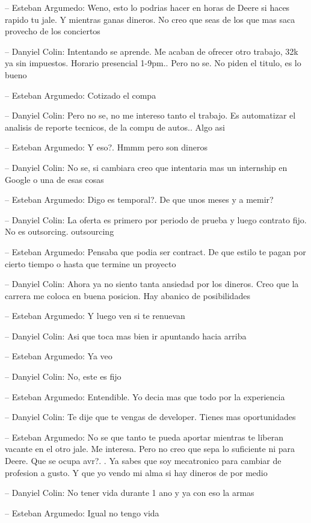 -- Esteban Argumedo: Weno, esto lo podrias hacer en horas de Deere si
haces rapido tu jale. Y mientras ganas dineros. No creo que seas de los
que mas saca provecho de los conciertos

-- Danyiel Colin: Intentando se aprende. Me acaban de ofrecer otro
trabajo, 32k ya sin impuestos. Horario presencial 1-9pm.. Pero no se. No
piden el titulo, es lo bueno

-- Esteban Argumedo: Cotizado el compa

-- Danyiel Colin: Pero no se, no me intereso tanto el trabajo. Es
automatizar el analisis de reporte tecnicos, de la compu de autos.. Algo
asi

-- Esteban Argumedo: Y eso?. Hmmm pero son dineros

-- Danyiel Colin: No se, si cambiara creo que intentaria mas un
internship en Google o una de esas cosas

-- Esteban Argumedo: Digo es temporal?. De que unos meses y a memir?

-- Danyiel Colin: La oferta es primero por periodo de prueba y luego
contrato fijo. No es outsorcing. outsourcing

-- Esteban Argumedo: Pensaba que podia ser contract. De que estilo te
pagan por cierto tiempo o hasta que termine un proyecto

-- Danyiel Colin: Ahora ya no siento tanta ansiedad por los dineros.
Creo que la carrera me coloca en buena posicion. Hay abanico de
posibilidades

-- Esteban Argumedo: Y luego ven si te renuevan

-- Danyiel Colin: Asi que toca mas bien ir apuntando hacia arriba

-- Esteban Argumedo: Ya veo

-- Danyiel Colin: No, este es fijo

-- Esteban Argumedo: Entendible. Yo decia mas que todo por la
experiencia

-- Danyiel Colin: Te dije que te vengas de developer. Tienes mas
oportunidades

-- Esteban Argumedo: No se que tanto te pueda aportar mientras te
liberan vacante en el otro jale. Me interesa. Pero no creo que sepa lo
suficiente ni para Deere. Que se ocupa avr?. . Ya sabes que soy
mecatronico para cambiar de profesion a gusto. Y que yo vendo mi alma si
hay dineros de por medio

-- Danyiel Colin: No tener vida durante 1 ano y ya con eso la armas

-- Esteban Argumedo: Igual no tengo vida

